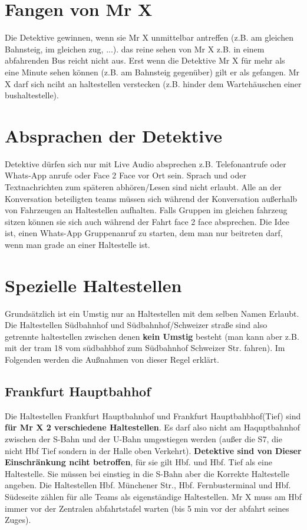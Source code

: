 \documentclass[12pt,a4paper]{article}
\begin{document}
\section{Fangen von Mr X}
Die Detektive gewinnen, wenn sie Mr X unmittelbar antreffen (z.B. am gleichen Bahnsteig, im gleichen zug, ...).
das reine sehen von Mr X z.B. in einem abfahrenden Bus reicht nicht aus.
Erst wenn die Detektive Mr X für mehr als eine Minute sehen können (z.B. am Bahnsteig gegenüber) gilt er als gefangen.
Mr X darf sich nciht an haltestellen verstecken (z.B. hinder dem Wartehäuschen einer bushaltestelle).

\section{Absprachen der Detektive}
Detektive dürfen sich nur mit Live Audio absprechen z.B. Telefonantrufe oder Whats-App anrufe oder Face 2 Face vor Ort sein.
Sprach und oder Textnachrichten zum späteren abhören/Lesen sind nicht erlaubt.
Alle an der Konversation beteiligten teams müssen sich während der Konversation außerhalb von Fahrzeugen an Haltestellen aufhalten.
Falls Gruppen im gleichen fahrzeug sitzen können sie sich auch während der Fahrt face 2 face absprechen.
Die Idee ist, einen Whats-App Gruppenanruf zu starten, dem man nur beitreten darf, wenn man grade an einer Haltestelle ist.

\section{Spezielle Haltestellen}
Grundsätzlich ist ein Umstig nur an Haltestellen mit dem selben Namen Erlaubt. 
Die Haltestellen Südbahnhof und Südbahnhof/Schweizer straße sind also getrennte haltestellen zwischen denen \textbf{kein Umstig} besteht (man kann aber z.B. mit der tram 18 vom südbahbhof zum Südbahnhof Schweizer Str. fahren).
Im Folgenden werden die Außnahmen von dieser Regel erklärt.

\subsection{Frankfurt Hauptbahhof}
Die Haltestellen Frankfurt Hauptbahnhof und Frankfurt Hauptbahbhof(Tief) sind \textbf{für Mr X 2 verschiedene Haltestellen}.
Es darf also nicht am Haquptbahnhof zwischen der S-Bahn und der U-Bahn umgestiegen werden (außer  die S7, die nicht Hbf Tief sondern in der Halle oben Verkehrt).
\textbf{Detektive sind von Dieser Einschränkung nciht betroffen}, für sie gilt Hbf. und Hbf. Tief als eine Haltestelle.
Sie müssen bei einstieg in die S-Bahn aber die Korrekte Haltestelle angeben.
Die Haltestellen Hbf. Münchener Str., Hbf. Fernbusterminal und Hbf. Südeseite zählen für alle Teams als eigenständige Haltestellen.
Mr X muss am Hbf immer vor der Zentralen abfahrtstafel warten (bis 5 min vor der abfahrt seines Zuges).
\end{document}
